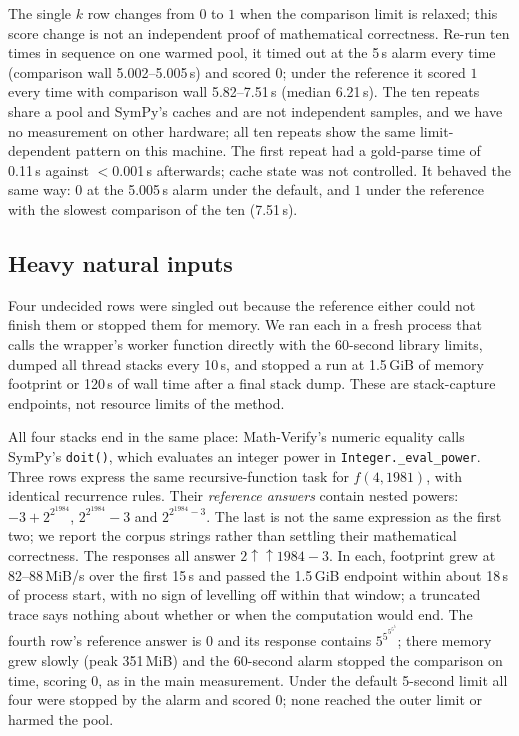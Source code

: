 \documentclass[10pt,a4paper]{article}
\newcommand{\mv}{Math-Verify}
\begin{document}
The single $k$ row changes from $0$ to $1$ when the comparison limit is
relaxed; this score change is not an independent proof of mathematical
correctness. Re-run ten times in sequence on one
warmed pool, it timed out at the 5\,s alarm every time (comparison wall
5.002--5.005\,s) and scored $0$; under the reference it scored $1$ every time
with comparison wall 5.82--7.51\,s (median 6.21\,s). The ten repeats share a
pool and SymPy's caches and are not independent samples, and we have no
measurement on other hardware; all ten repeats show the same limit-dependent
pattern on this machine. The first repeat had a gold-parse time of 0.11\,s
against $<$0.001\,s afterwards; cache state was not controlled. It behaved
the same way: $0$ at the 5.005\,s alarm
under the default, and $1$ under the reference with the slowest comparison of
the ten (7.51\,s).

\subsection{Heavy natural inputs}
\label{sec:prevalence-heavy}

Four undecided rows were singled out because the reference either could not
finish them or stopped them for memory. We ran each in a fresh process that
calls the wrapper's worker function directly with the 60-second library
limits, dumped all thread stacks every 10\,s, and stopped a run at 1.5\,GiB of
memory footprint or 120\,s of wall time after a final stack dump. These are
stack-capture endpoints, not resource limits of the method.

All four stacks end in the same place: \mv{}'s numeric equality calls SymPy's
\texttt{doit()}, which evaluates an integer power in
\texttt{Integer.\_eval\_power}. Three rows express the same recursive-function
task for $f(4,1981)$, with identical recurrence rules. Their \emph{reference answers} contain nested
powers: $-3+2^{2^{1984}}$, $2^{2^{1984}}-3$ and $2^{2^{1984}-3}$.
The last is not the same expression as the first two; we report the corpus
strings rather than settling their mathematical correctness. The responses
all answer $2\uparrow\uparrow 1984-3$. In each, footprint grew at 82--88\,MiB/s over the
first 15\,s and passed the 1.5\,GiB endpoint within about 18\,s of process
start, with no sign of levelling off within that window; a truncated
trace says nothing about whether or when the computation would end. The fourth row's reference answer is $0$ and its response
contains $5^{5^{5^{5^{5}}}}$; there memory grew slowly (peak 351\,MiB) and the
60-second alarm stopped the comparison on time, scoring $0$, as in the main
measurement. Under the default 5-second limit all four were stopped by the
alarm and scored $0$; none reached the outer limit or harmed the pool.
\end{document}
